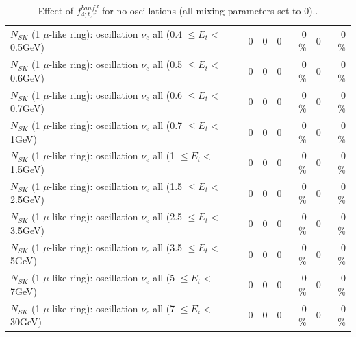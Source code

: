 \begin{table}
\begin{tabular}{| l | r | r | r  r | r  r |}
$N_{SK}$ (1 $\mu$-like ring): oscillation $\nu_{e}$ all (0.4 $\leq E_{t} <$ 0.5GeV) &               0 &               0 &               0 &        0 \%  &               0 &        0 \%  \\ 
$N_{SK}$ (1 $\mu$-like ring): oscillation $\nu_{e}$ all (0.5 $\leq E_{t} <$ 0.6GeV) &               0 &               0 &               0 &        0 \%  &               0 &        0 \%  \\ 
$N_{SK}$ (1 $\mu$-like ring): oscillation $\nu_{e}$ all (0.6 $\leq E_{t} <$ 0.7GeV) &               0 &               0 &               0 &        0 \%  &               0 &        0 \%  \\ 
$N_{SK}$ (1 $\mu$-like ring): oscillation $\nu_{e}$ all (0.7 $\leq E_{t} <$ 1GeV) &               0 &               0 &               0 &        0 \%  &               0 &        0 \%  \\ 
$N_{SK}$ (1 $\mu$-like ring): oscillation $\nu_{e}$ all (1 $\leq E_{t} <$ 1.5GeV) &               0 &               0 &               0 &        0 \%  &               0 &        0 \%  \\ 
$N_{SK}$ (1 $\mu$-like ring): oscillation $\nu_{e}$ all (1.5 $\leq E_{t} <$ 2.5GeV) &               0 &               0 &               0 &        0 \%  &               0 &        0 \%  \\ 
$N_{SK}$ (1 $\mu$-like ring): oscillation $\nu_{e}$ all (2.5 $\leq E_{t} <$ 3.5GeV) &               0 &               0 &               0 &        0 \%  &               0 &        0 \%  \\ 
$N_{SK}$ (1 $\mu$-like ring): oscillation $\nu_{e}$ all (3.5 $\leq E_{t} <$ 5GeV) &               0 &               0 &               0 &        0 \%  &               0 &        0 \%  \\ 
 $N_{SK}$ (1 $\mu$-like ring): oscillation $\nu_{e}$ all (5 $\leq E_{t} <$ 7GeV) &               0 &               0 &               0 &        0 \%  &               0 &        0 \%  \\ 
$N_{SK}$ (1 $\mu$-like ring): oscillation $\nu_{e}$ all (7 $\leq E_{t} <$ 30GeV) &               0 &               0 &               0 &        0 \%  &               0 &        0 \%  \\ 
\hline
\hline
\end{tabular}
\caption{ Effect of $f_{4; t, r}^{banff}$ for no oscillations (all mixing parameters set to 0).. }
\label{tab:num_banff_04_1RmuT_3f_osc_t13:0}
\end{table}
\clearpage
